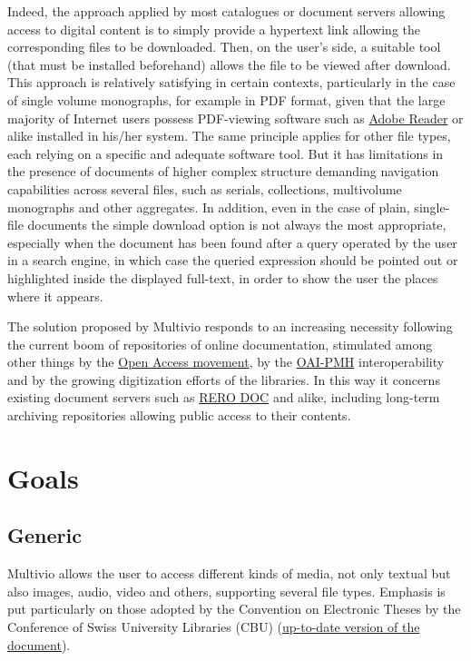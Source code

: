 \documentclass [a4paper]{article}
\begin{document}
Indeed, the approach applied by most catalogues or document servers allowing
access to digital content is to simply provide a hypertext link allowing the
corresponding files to be downloaded. Then, on the user's side, a suitable tool
(that must be installed beforehand) allows the file to be viewed after
download. This approach is relatively satisfying in certain contexts,
particularly in the case of single volume monographs, for example in PDF
format, given that the large majority of Internet users possess PDF-viewing
software such as \href{http://www.adobe.com/products/reader/}{Adobe Reader} or alike
installed in his/her system. The same principle applies for other file types,
each relying on a specific and adequate software tool. But it has limitations
in the presence of documents of higher complex structure demanding navigation
capabilities across several files, such as serials, collections, multivolume
monographs and other aggregates. In addition, even in the case of plain,
single-file documents the simple download option is not always the most
appropriate, especially when the document has been found after a query operated
by the user in a search engine, in which case the queried expression should be
pointed out or highlighted inside the displayed full-text, in order to show the
user the places where it appears.

The solution proposed by Multivio responds to an increasing necessity following
the current boom of repositories of online documentation, stimulated among
other things by the
\href{http://en.wikipedia.org/w/index.php?title=Open_access_(publishing)&oldid=271257177}
{Open Access movement}, by the \href{http://www.openarchives.org/}{OAI-PMH}
interoperability and by the growing digitization efforts of the libraries. In
this way it concerns existing document servers such as \href{http://doc.rero.ch/}
{RERO DOC} and alike, including long-term archiving repositories allowing public
access to their contents.

\section{Goals}

\subsection{Generic}

Multivio allows the user to access different kinds of media, not only textual
but also images, audio, video and others, supporting several file types.
Emphasis is put particularly on those adopted by the Convention on Electronic
Theses by the Conference of Swiss University Libraries (CBU)
(\href{http://www.kub-cbu.ch/navi.cfm?st1=400&st2=200&st3=&st4=&w=1600&status=2}
{up-to-date version of the document}).
\end{document}
